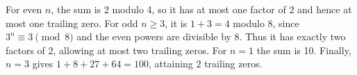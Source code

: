 For even $n$, the sum is 2 modulo 4, so it has at most one factor of 2 and hence at most one trailing zero. For odd $n\ge3$, it is $1+3=4$ modulo 8, since $3^n\equiv3\pmod8$ and the even powers are divisible by 8. Thus it has exactly two factors of 2, allowing at most two trailing zeros. For $n=1$ the sum is 10. Finally, $n=3$ gives $1+8+27+64=100$, attaining $\boxed2$ trailing zeros.
